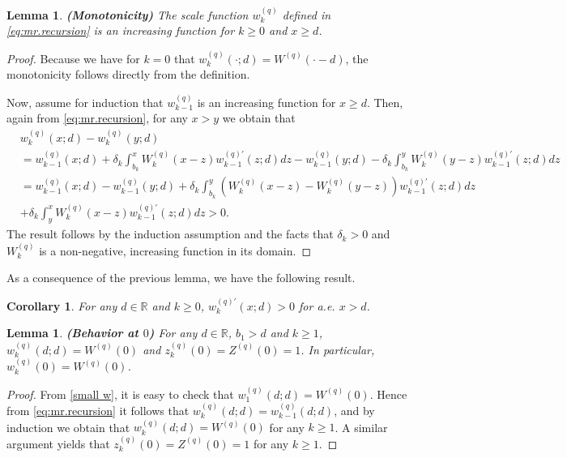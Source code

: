 \documentclass[12pt,reqno]{amsart}
\newtheorem{lemma}[theorem]{Lemma}
\newtheorem{corol}[theorem]{Corollary}
\theoremstyle{definition}
\theoremstyle{remark}
\begin{document}
\begin{lemma}{\textbf{(Monotonicity)}}
The scale function $w_k^{(q)}$ defined in \eqref{eq:mr.recursion} is an increasing function for $k\geq 0$ and $x\geq d$.
\end{lemma}
\begin{proof}
Because we have for $k=0$ that $w_k^{(q)}(\cdot;d)=W^{(q)}(\cdot-d)$, the monotonicity follows directly from the definition. 
  
Now, assume for induction that $w_{k-1}^{(q)}$ is an increasing function for $x\geq d$.
Then, again from \eqref{eq:mr.recursion}, for any $x>y$ we obtain that
\begin{align*}
&w_k^{(q)}(x;d)-w_k^{(q)}(y;d)\\&=w_{k-1}^{(q)}(x;d)+\delta_k\int_{b_k}^x W_k^{(q)}(x-z)w_{k-1}^{(q)\prime}(z;d)dz
-w_{k-1}^{(q)}(y;d)-\delta_k\int_{b_k}^{y} W_k^{(q)}(y-z)w_{k-1}^{(q)\prime}(z;d)dz\\&
=w_{k-1}^{(q)}(x;d)-w_{k-1}^{(q)}(y;d)+\delta_k\int_{b_k}^y\left( W_k^{(q)}(x-z)-W_k^{(q)}(y-z)\right)w_{k-1}^{(q)\prime}(z;d)dz\\
&+\delta_k\int_{y}^x W_k^{(q)}(x-z)w_{k-1}^{(q)\prime}(z;d)dz >0.
\end{align*}
The result follows by the induction assumption and the facts that $\delta_k>0$ and $W_k^{(q)}$ is a non-negative, increasing function in its domain. 
\end{proof}
  
	As a consequence of the previous lemma, we have the following result.
		\begin{corol} \label{derivative}
			For any $d \in \mathbb{R}$ and $k\geq 0$, $w_{k}^{(q)\prime}(x;d)> 0$ for a.e. $x > d$.
		\end{corol}
		
	\begin{lemma}{\textbf{(Behavior at $0$)}} For any $d \in \mathbb{R}$, $b_1>d$ and $k \geq 1$,
	 $w_k^{(q)}(d;d)=W^{(q)}(0)$ and $z_k^{(q)}(0)=Z^{(q)}(0)=1$. In particular, $w_k^{(q)}(0)=W^{(q)}(0)$. 
	\end{lemma}
	\begin{proof}
	From \eqref{small w}, it is easy to check that  $w_1^{(q)}(d;d)=W^{(q)}(0)$. Hence from \eqref{eq:mr.recursion} it follows that
	$w_k^{(q)}(d;d)=w_{k-1}^{(q)}(d;d)$, and by induction we obtain that $w_k^{(q)}(d;d)=W^{(q)}(0)$ for any $k \geq 1$.
	A similar argument yields that $z_k^{(q)}(0)=Z^{(q)}(0)=1$ for any $k \geq 1$.
	\end{proof}
	
\end{document}
